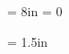 



\newinsert\m@arginbox 
\dimen\m@arginbox = 8in
\count\m@arginbox = 0

\newdimen\h@marginboxsize \h@marginboxsize = 1.5in
\def\margin#1{\gdef\m@ext{\insert\m@arginbox{\vskip 
             1ex\hbox{\notefont\quad#1}}}\ifinner 
              \aftergroup\m@ext \else \m@ext \fi}

\newif\ifmarginnotes
\def\proofmargin#1{\xdef\p@ff{#1}\ifmarginnotes\margin{\p@ff}\fi}


\newif\ifproofmode \proofmodetrue %
\def\draftversion{\proofmodetrue \marginnotestrue \overfullrule = 5pt}
\def\finalversion{\proofmodefalse \marginnotesfalse \overfullrule = 0pt}

